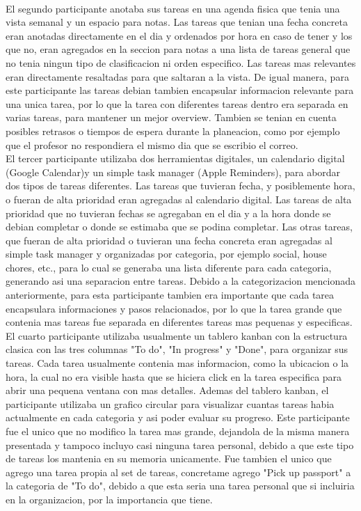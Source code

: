 \\
El segundo participante anotaba sus tareas en una agenda fisica que tenia una vista semanal y un espacio para notas. Las tareas que tenian una fecha concreta eran anotadas directamente en el dia y ordenados por hora en caso de tener y los que no, eran agregados en la seccion para notas a una lista de tareas general que no tenia ningun tipo de clasificacion ni orden especifico. Las tareas mas relevantes eran directamente resaltadas para que saltaran a la vista. De igual manera, para este participante las tareas debian tambien encapsular informacion relevante para una unica tarea, por lo que la tarea con diferentes tareas dentro era separada en varias tareas, para mantener un mejor overview. Tambien se tenian en cuenta posibles retrasos o tiempos de espera durante la planeacion, como por ejemplo que el profesor no respondiera el mismo dia que se escribio el correo. 
\\
El tercer participante utilizaba dos herramientas digitales, un calendario digital (Google Calendar)y un simple task manager (Apple Reminders), para abordar dos tipos de tareas diferentes. Las tareas que tuvieran fecha, y posiblemente hora, o fueran de alta prioridad eran agregadas al calendario digital. Las tareas de alta prioridad que no tuvieran fechas se agregaban en el dia y a la hora donde se debian completar o donde se estimaba que se podina completar. Las otras tareas, que fueran de alta prioridad o tuvieran una fecha concreta eran agregadas al simple task manager y organizadas por categoria, por ejemplo social, house chores, etc., para lo cual se generaba una lista diferente para cada categoria, generando asi una separacion entre tareas. Debido a la categorizacion mencionada anteriormente, para esta participante tambien era importante que cada tarea encapsulara informaciones y pasos relacionados, por lo que la tarea grande que contenia mas tareas fue separada en diferentes tareas mas pequenas y especificas. 
\\
El cuarto participante utilizaba usualmente un tablero kanban con la estructura clasica con las tres columnas "To do", "In progress" y "Done", para organizar sus tareas. Cada tarea usualmente contenia mas informacion, como la ubicacion o la hora, la cual no era visible hasta que se hiciera click en la tarea especifica para abrir una pequena ventana con mas detalles. Ademas del tablero kanban, el participante utilizaba un grafico circular para visualizar cuantas tareas habia actualmente en cada categoria y asi poder evaluar su progreso.  Este participante fue el unico que no modifico la tarea mas grande, dejandola de la misma manera presentada y tampoco incluyo casi ninguna tarea personal, debido a que este tipo de tareas los mantenia en su memoria unicamente. Fue tambien el unico que agrego una tarea propia al set de tareas, concretame agrego "Pick up passport" a la categoria de "To do", debido a que esta seria una tarea personal que si incluiria en la organizacion, por la importancia que tiene. 
